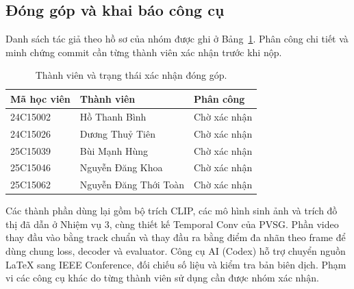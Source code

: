 \subsection{Đóng góp và khai báo công cụ}
Danh sách tác giả theo hồ sơ của nhóm được ghi ở Bảng~\ref{tab:credits}.
Phân công chi tiết và minh chứng commit cần từng thành viên xác nhận trước khi nộp.
\begin{table}[!ht]\centering\small
\caption{Thành viên và trạng thái xác nhận đóng góp.}\label{tab:credits}
\begin{tabular}{@{}lll@{}}\toprule
Mã học viên & Thành viên & Phân công\\\midrule
24C15002 & Hồ Thanh Bình & Chờ xác nhận\\
24C15026 & Dương Thuỷ Tiên & Chờ xác nhận\\
25C15039 & Bùi Mạnh Hùng & Chờ xác nhận\\
25C15046 & Nguyễn Đăng Khoa & Chờ xác nhận\\
25C15062 & Nguyễn Đăng Thới Toàn & Chờ xác nhận\\
\bottomrule\end{tabular}
\end{table}
Các thành phần dùng lại gồm bộ trích CLIP, các mô hình sinh ảnh và trích
đồ thị đã dẫn ở Nhiệm vụ 3, cùng thiết kế Temporal Conv của PVSG.
Phần video thay đầu vào bằng track chuẩn và thay đầu ra bằng điểm đa nhãn
theo frame để dùng chung loss, decoder và evaluator. Công cụ AI (Codex)
hỗ trợ chuyển nguồn LaTeX sang IEEE Conference, đối chiếu số liệu và kiểm
tra bản biên dịch. Phạm vi các công cụ khác do từng thành viên sử dụng
cần được nhóm xác nhận.
